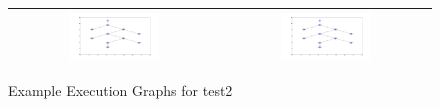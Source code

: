 \begin{figure}[ht]
\begin{tabular}{| c | c |}
   \includegraphics[width=0.45\textwidth]{graphs/2_6}
   &\includegraphics[width=0.45\textwidth]{graphs/2_7}\\\hline
 \end{tabular}
 \caption{Example Execution Graphs for test2}
 \label{figure:examplegraphs2}
\end{figure}
